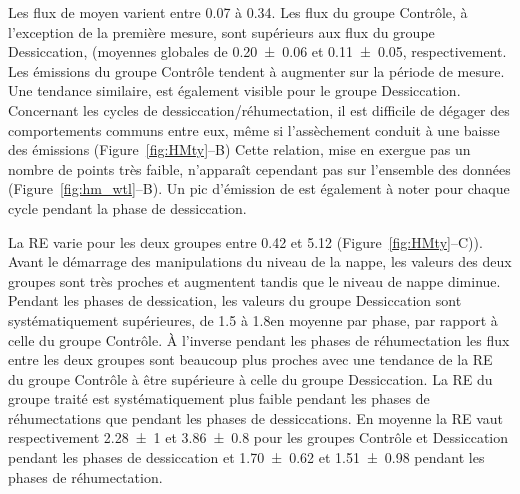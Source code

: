 Les flux de \chh moyen varient entre \num{0.07} à \SI{0.34}{\uml}.
Les flux du groupe Contrôle, à l'exception de la première mesure, sont supérieurs aux flux du groupe Dessiccation, (moyennes globales de \num{0.20(006)} et \SI{0.11(005)}{\uml}, respectivement.
Les émissions du groupe Contrôle tendent à augmenter sur la période de mesure.
Une tendance similaire, est également visible pour le groupe Dessiccation.
Concernant les cycles de dessiccation/réhumectation, il est difficile de dégager des comportements communs entre eux, même si l'assèchement conduit à une baisse des émissions (Figure~\ref{fig:HMty}--B)
Cette relation, mise en exergue pas un nombre de points très faible, n’apparaît cependant pas sur l'ensemble des données (Figure~\ref{fig:hm_wtl}--B).
Un pic d'émission de \chh est également à noter pour chaque cycle pendant la phase de dessiccation.

La RE varie pour les deux groupes entre \num{0.42} et \SI{5.12}{\uml} (Figure~\ref{fig:HMty}--C)).
Avant le démarrage des manipulations du niveau de la nappe, les valeurs des deux groupes sont très proches et augmentent tandis que le niveau de nappe diminue.
Pendant les phases de dessication, les valeurs du groupe Dessiccation sont systématiquement supérieures, de \num{1.5} à \SI{1.8}{\uml}en moyenne par phase, par rapport à celle du groupe Contrôle.
À l'inverse pendant les phases de réhumectation les flux entre les deux groupes sont beaucoup plus proches avec une tendance de la RE du groupe Contrôle à être supérieure à celle du groupe Dessiccation.
La RE du groupe traité est systématiquement plus faible pendant les phases de réhumectations que pendant les phases de dessiccations.
En moyenne la RE vaut respectivement \num{2.28(100)} et \SI{3.86(080)}{\uml} pour les groupes Contrôle et Dessiccation pendant les phases de dessiccation et \num{1.70(062)} et \SI{1.51(098)}{\uml} pendant les phases de réhumectation.

